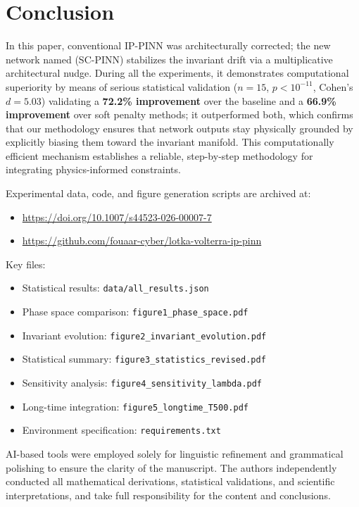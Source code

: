 \documentclass[pdflatex,sn-mathphys-num]{sn-jnl}
\theoremstyle{thmstyleone}%
\theoremstyle{thmstyletwo}%
\theoremstyle{thmstylethree}%
\newcommand{\methodname}{SC-PINN}
\begin{document}
	\section{Conclusion}\label{sec8}
	
	In this paper, conventional IP-PINN was architecturally corrected; the new network named (\methodname) stabilizes the invariant drift via a multiplicative architectural nudge. During all the experiments, it demonstrates computational superiority by means of serious statistical validation ($n=15$, $p < 10^{-11}$, Cohen's $d = 5.03$) validating a \textbf{72.2\% improvement} over the baseline and a \textbf{66.9\% improvement} over soft penalty methods; it outperformed both, which confirms that our methodology ensures that network outputs stay physically grounded by explicitly biasing them toward the invariant manifold. This computationally efficient mechanism establishes a reliable, step-by-step methodology for integrating physics-informed constraints.
	
	\backmatter
	
	
	Experimental data, code, and figure generation scripts are archived at:
	\begin{itemize}
		\item \url{https://doi.org/10.1007/s44523-026-00007-7}
		\item \url{https://github.com/fouaar-cyber/lotka-volterra-ip-pinn}
	\end{itemize}
	
	Key files:
	\begin{itemize}
		\item Statistical results: \texttt{data/all\_results.json}
		\item Phase space comparison: \texttt{figure1\_phase\_space.pdf}
		\item Invariant evolution: \texttt{figure2\_invariant\_evolution.pdf}
		\item Statistical summary: \texttt{figure3\_statistics\_revised.pdf}
		\item Sensitivity analysis: \texttt{figure4\_sensitivity\_lambda.pdf}
		\item Long-time integration: \texttt{figure5\_longtime\_T500.pdf}
		\item Environment specification: \texttt{requirements.txt}
	\end{itemize}
	
	
	AI-based tools were employed solely for linguistic refinement and grammatical polishing to ensure the clarity of the manuscript. The authors independently conducted all mathematical derivations, statistical validations, and scientific interpretations, and take full responsibility for the content and conclusions.
	
\end{document}

